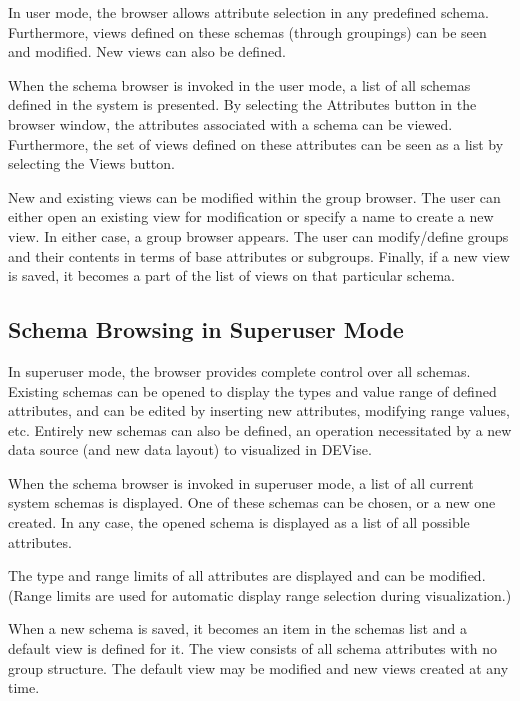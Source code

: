 In user mode, the browser allows attribute selection in any predefined schema.
Furthermore, views defined on these schemas (through groupings) can be seen and
modified. New views can also be defined.

When the schema browser is invoked in the user mode, a list of all schemas
defined in the system is presented. By selecting the Attributes button in the
browser window, the attributes associated with a schema can be viewed.
Furthermore, the set of views defined on these attributes can be seen as a list
by selecting the Views button.

New and existing views can be modified within the group browser.  The user can
either open an existing view for modification or specify a name to create a new
view. In either case, a group browser appears. The user can modify/define groups
and their contents in terms of base attributes or subgroups. Finally, if a new
view is saved, it becomes a part of the list of views on that particular schema.



\subsection{Schema Browsing in Superuser Mode}

In superuser mode, the browser provides complete control over all schemas.
Existing schemas can be opened to display the types and value range of defined
attributes, and can be edited by inserting new attributes, modifying range
values, etc. Entirely new schemas can also be defined, an operation
necessitated by a new data source (and new data layout) to visualized in DEVise.

When the schema browser is invoked in superuser mode, a list of all current
system schemas is displayed. One of these schemas can be chosen, or a new one
created. In any case, the opened schema is displayed as a list of all possible
attributes.

The type and range limits of all attributes are displayed and can be modified.
(Range limits are used for automatic display range selection during
visualization.)

When a new schema is saved, it becomes an item in the schemas list and a
default view is defined for it. The view consists of all schema attributes with
no group structure. The default view may be modified and new views created at
any time.

